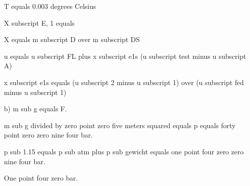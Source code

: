 T equals 0.003 degrees Celsius

X subscript E, 1 equals

X equals m subscript D over m subscript DS

u equals u subscript FL plus x subscript e1s (u subscript test minus u subscript A)

x subscript e1s equals (u subscript 2 minus u subscript 1) over (u subscript fed minus u subscript 1)

b) m sub g equals F.

m sub g divided by zero point zero five meters squared equals p equals forty point zero zero nine four bar.

p sub 1.15 equals p sub atm plus p sub gewicht equals one point four zero zero nine four bar.

One point four zero bar.